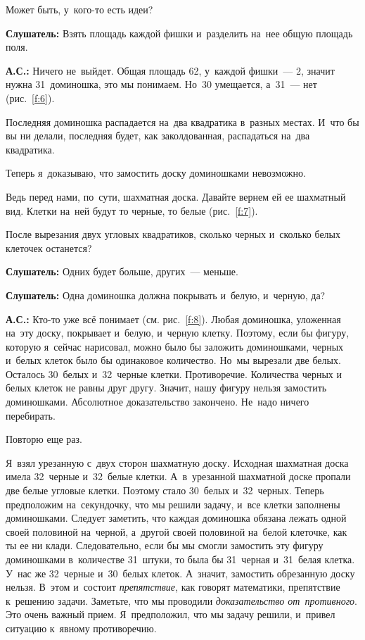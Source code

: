 Может быть, у~кого-то есть идеи?

\textbf{Слушатель:} Взять площадь каждой фишки и~разделить на~нее общую площадь поля.

\textbf{А.С.:} Ничего не~выйдет. Общая площадь 62, у~каждой фишки~--- 2, значит нужна 31~доминошка,
это мы понимаем. Но~30 умещается, а~31~--- нет (рис.~\ref{f:6}).


Последняя доминошка распадается на~два квадратика в~разных местах. И~что бы вы ни делали, последняя
будет, как заколдованная, распадаться на~два квадратика.

Теперь я~доказываю, что замостить доску доминошками невозможно.

Ведь перед нами, по~сути, шахматная доска. Давайте вернем ей ее шахматный вид. Клетки на~ней будут
то черные, то белые (рис.~\ref{f:7}).


После вырезания двух угловых квадратиков, сколько черных и~сколько белых клеточек останется?


\textbf{Слушатель:} Одних будет больше, других~--- меньше.


\textbf{Слушатель:} Одна доминошка должна покрывать и~белую, и~черную, да?

\textbf{А.С.:} Кто-то уже всё понимает (см. рис.~\ref{f:8}). Любая доминошка, уложенная на~эту
доску, покрывает и~белую, и~черную клетку. Поэтому, если бы фигуру, которую я~сейчас нарисовал,
можно было бы заложить доминошками, черных и~белых клеток было бы одинаковое количество. Но~мы
вырезали две белых. Осталось 30~белых и~32~черные клетки. Противоречие. Количества черных и белых клеток не равны друг другу.
Значит, нашу фигуру нельзя замостить доминошками. Абсолютное доказательство закончено. Не~надо
ничего перебирать.

Повторю еще раз.

\pagebreak

Я~взял урезанную с~двух сторон шахматную доску. Исходная шахматная доска имела 32~черные и~32~белые клетки.
А~в~урезанной шахматной доске пропали две белые угловые клетки. Поэтому стало 30~белых
и~32~черных. Теперь предположим на~секундочку, что мы решили задачу, и~все клетки заполнены
доминошками. Следует заметить, что каждая доминошка обязана лежать одной своей половиной на~черной,
а~другой своей половиной на~белой клеточке, как ты ее ни клади. Следовательно, если бы мы смогли
замостить эту фигуру доминошками в~количестве 31~штуки, то была бы 31~черная и~31~белая клетка.
У~нас же 32~черные и~30~белых клеток. А~значит, замостить обрезанную доску нельзя.
В~этом и~состоит \textit{препятствие}, как говорят математики, препятствие к~решению задачи. Заметьте, что мы
проводили \textit{доказательство от~противного}. Это очень важный прием. Я~предположил, что мы задачу
решили, и~привел ситуацию к~явному противоречию.

